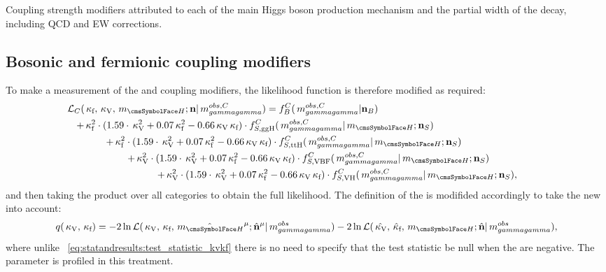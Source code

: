  \begin{table}[h]
 \resizebox{\textwidth}{!}{

}
 \caption{Coupling strength modifiers attributed to each of the main Higgs boson production mechanism \crosssection\s and the partial width of the \Hgg decay, including QCD and EW corrections.}
 \label{tab:statandresults:kappas}
\end{table}

\subsection{Bosonic and fermionic coupling modifiers}
To make a measurement of the \kf and \kV coupling modifiers, the likelihood function is therefore modified as required: 
\begin{equation}
\label{eq:statandresults:likelihood_function_muProc}
\begin{split} \mathcal{L}_C(\kf,\kV, \mH; \mathbf{n} | \mgg^{obs,C} ) = f^C_B(\mgg^{obs,C} | \mathbf{n}_B )\hspace{6cm}  \\ 
+ \kf^2\cdot(1.59\cdot\kV^2 + 0.07\kf^2 - 0.66\kV\kf) \cdot  f^C_{S,{\text{ggH}}}(\mgg^{obs,C} |\mH ; \mathbf{n}_S) \hspace{4cm} \\ 
+ \kf^2\cdot(1.59\cdot\kV^2 + 0.07\kf^2 - 0.66\kV\kf) \cdot f^C_{S,{\text{ttH}}}(\mgg^{obs,C} |\mH ; \mathbf{n}_S) \hspace{3cm}  \\  
+ \kV^2\cdot(1.59\cdot\kV^2 + 0.07\kf^2 - 0.66\kV\kf) \cdot  f^C_{S,{\text{VBF}}}(\mgg^{obs,C} |\mH ; \mathbf{n}_S) \hspace{2cm} \\
+ \kV^2\cdot(1.59\cdot\kV^2 + 0.07\kf^2 - 0.66\kV\kf) \cdot f^C_{S,{\text{VH}}}(\mgg^{obs,C} |\mH ; \mathbf{n}_S),  \hspace{1cm} \\  
\end{split} 
\end{equation}
and then taking the product over all categories to obtain the full likelihood. The definition of the \DNLL is modifided accordingly to take the new \POI\s into account:
\begin{equation}
\label{eq:statandresults:test_statistic_kvkf}
 q(\kV,\kf)= -2 \ln \mathcal{L}(\kV,\kf,\hat{\mH}^{\mu}; \hat{\mathbf{n}}^{\mu}| \mgg^{obs})- 2\ln\mathcal{L}(\hat{\kV},\hat{\kf},\mH;\hat{\mathbf{n}}| \mgg^{obs} ),
\end{equation}
where unlike \Eq~\ref{eq:statandresults:test_statistic_kvkf} there is no need to specify that the test statistic be null when the \POI\s are negative. The \mH parameter is profiled in this treatment.

